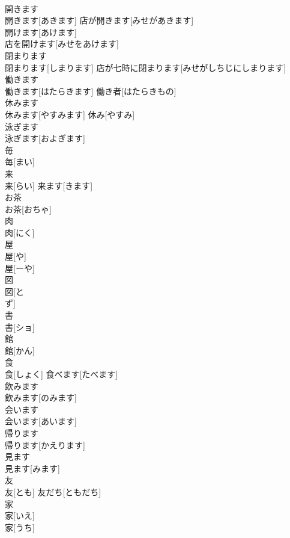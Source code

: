 \documentclass[8pt]{extreport}
\begin{document}
\begin{CJK}{UTF8}{min}
\\	開きます	
\\	開きます[あきます]	店が開きます[みせがあきます] 
\\	開けます[あけます] 
\\	店を開けます[みせをあけます] 
\\	閉まります	
\\	閉まります[しまります]	店が七時に閉まります[みせがしちじにしまります] 
\\	働きます	
\\	働きます[はたらきます]	働き者[はたらきもの] 
\\	休みます	
\\	休みます[やすみます]	休み[やすみ] 
\\	泳ぎます	
\\	泳ぎます[およぎます]	
\\	毎	
\\	毎[まい]	
\\	来	
\\	来[らい]	来ます[きます] 
\\	お茶	
\\	お茶[おちゃ]	
\\	肉	
\\	肉[にく]	
\\	屋	
\\	屋[や] 
\\	屋[ーや]	
\\	図	
\\	図[と 
\\	ず]	
\\	書	
\\	書[ショ]	
\\	館	
\\	館[かん]	
\\	食	
\\	食[しょく]	食べます[たべます] 
\\	飲みます	
\\	飲みます[のみます]	
\\	会います	
\\	会います[あいます]	
\\	帰ります	
\\	帰ります[かえります]	
\\	見ます	
\\	見ます[みます]	
\\	友	
\\	友[とも]	友だち[ともだち] 
\\	家	
\\	家[いえ] 
\\	家[うち]	

\end{CJK}
\end{document}
